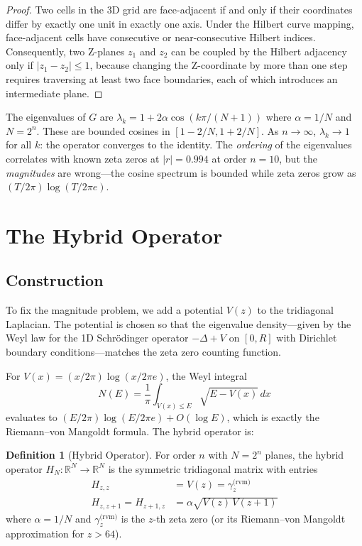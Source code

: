 \documentclass[11pt,a4paper]{article}
\theoremstyle{definition}
\newtheorem{definition}{Definition}[section]
\begin{document}
\begin{proof}
Two cells in the 3D grid are face-adjacent if and only if their
coordinates differ by exactly one unit in exactly one axis. Under the
Hilbert curve mapping, face-adjacent cells have consecutive or
near-consecutive Hilbert indices. Consequently, two Z-planes $z_1$
and $z_2$ can be coupled by the Hilbert adjacency only if
$|z_1 - z_2| \leq 1$, because changing the Z-coordinate by more than
one step requires traversing at least two face boundaries, each of
which introduces an intermediate plane.
\end{proof}

The eigenvalues of $G$ are $\lambda_k = 1 + 2\alpha \cos(k\pi/(N+1))$
where $\alpha = 1/N$ and $N = 2^n$. These are bounded cosines in
$[1-2/N, 1+2/N]$. As $n \to \infty$, $\lambda_k \to 1$ for all $k$:
the operator converges to the identity. The \emph{ordering} of the
eigenvalues correlates with known zeta zeros at $|r| = 0.994$ at order
$n=10$, but the \emph{magnitudes} are wrong---the cosine spectrum is
bounded while zeta zeros grow as $(T/2\pi)\log(T/2\pi e)$.

\section{The Hybrid Operator}

\subsection{Construction}

To fix the magnitude problem, we add a potential $V(z)$ to the
tridiagonal Laplacian. The potential is chosen so that the eigenvalue
density---given by the Weyl law for the 1D Schr\"{o}dinger operator
$-\Delta + V$ on $[0,R]$ with Dirichlet boundary conditions---matches
the zeta zero counting function.

For $V(x) = (x/2\pi)\log(x/2\pi e)$, the Weyl integral
\[
N(E) = \frac{1}{\pi} \int_{V(x) \leq E} \sqrt{E - V(x)}\,dx
\]
evaluates to $(E/2\pi)\log(E/2\pi e) + O(\log E)$, which is exactly
the Riemann--von Mangoldt formula. The hybrid operator is:

\begin{definition}[Hybrid Operator]
For order $n$ with $N = 2^n$ planes, the hybrid operator
$H_N: \mathbb{R}^N \to \mathbb{R}^N$ is the symmetric tridiagonal
matrix with entries
\begin{align*}
H_{z,z} &= V(z) = \gamma_z^{\text{(rvm)}} \\
H_{z,z+1} = H_{z+1,z} &= \alpha \sqrt{V(z)\,V(z+1)}
\end{align*}
where $\alpha = 1/N$ and $\gamma_z^{\text{(rvm)}}$ is the $z$-th zeta
zero (or its Riemann--von Mangoldt approximation for $z > 64$).
\end{definition}
\end{document}
